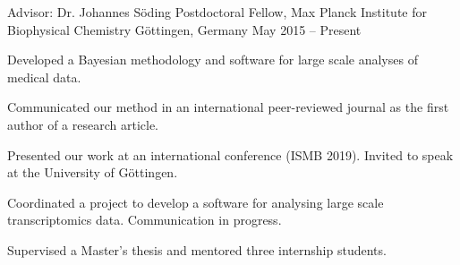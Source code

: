 


\begin{cventries}


\cventry
{Advisor: Dr. Johannes S{\"o}ding} %
{Postdoctoral Fellow, Max Planck Institute for Biophysical Chemistry} %
{G{\"o}ttingen, Germany} %
{May 2015 -- Present} %
{ %
\begin{cvitems}
\item {Developed a Bayesian methodology and software for large scale analyses of medical data.}
\item {Communicated our method in an international peer-reviewed journal as the first author of a research article.}
\item {Presented our work at an international conference (ISMB 2019). Invited to speak at the University of G{\"o}ttingen.}
\item {Coordinated a project to develop a software for analysing large scale transcriptomics data. Communication in progress.}
\item {Supervised a Master's thesis and mentored three internship students.}
\end{cvitems}
}



\end{cventries}
